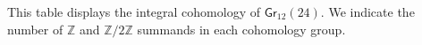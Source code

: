 \documentclass{article}
\newcommand{\msf}[1]{\mathsf{#1}}
\newcommand{\gr}{\msf{Gr}}
\newcommand{\nchoosek}{\textstyle\genfrac{\lbrace}{\rbrace}{0pt}{}}
\newcommand{\Z}{\mathbb{Z}}
\theoremstyle{definition}
\newtheorem{problem}[theorem]{Problem}
\begin{document}
% 

\begin{table}[H]

\caption{This table displays the integral cohomology of $\gr_{12}(24)$. We indicate the number of $\Z$ and $\Z/2\Z$ summands in each cohomology group.}
\label{gr1224}
\end{table}













% 
\end{document}
